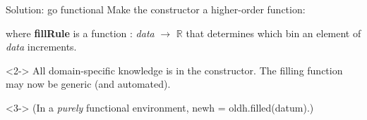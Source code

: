 \documentclass[aspectratio=169]{beamer}
\begin{document}
\begin{frame}[fragile]{Solution: go functional}
\vspace{0.5 cm}
Make the constructor a higher-order function:

\begin{center}
\end{center}

where {\ttfamily\small\textbf{fillRule}} is a function : {\it data} $\to$ $\mathbb{R}$ that determines which bin an element of {\it data} increments.

\begin{uncoverenv}<2->
\vspace{0.5 cm}
All domain-specific knowledge is in the constructor. The filling function may now be generic (and automated).

\begin{center}
\end{center}
\end{uncoverenv}

\begin{uncoverenv}<3->
\vspace{0.15 cm}
(In a {\it purely} functional environment, {\ttfamily\small newh = oldh.filled(datum)}.)
\end{uncoverenv}
\end{frame}
\end{document}
